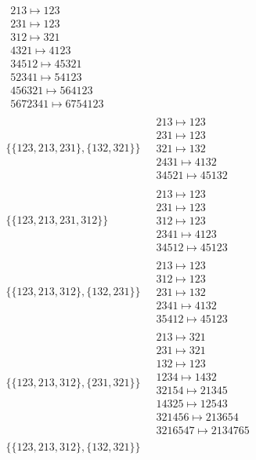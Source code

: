 \begin{scriptsize}
\begin{align}
\begin{matrix}
213 \mapsto 123
\\
231 \mapsto 123
\\
312 \mapsto 321
\\
4321 \mapsto 4123
\\
34512 \mapsto 45321
\\
52341 \mapsto 54123
\\
456321 \mapsto 564123
\\
5672341 \mapsto 6754123
\end{matrix}
\\
\{\{123, 213, 231\}, \{132, 321\}\}
\ 
&
\begin{matrix}
213 \mapsto 123
\\
231 \mapsto 123
\\
321 \mapsto 132
\\
2431 \mapsto 4132
\\
34521 \mapsto 45132
\end{matrix}
\\
\{\{123, 213, 231, 312\}\}
\ 
&
\begin{matrix}
213 \mapsto 123
\\
231 \mapsto 123
\\
312 \mapsto 123
\\
2341 \mapsto 4123
\\
34512 \mapsto 45123
\end{matrix}
\\
\{\{123, 213, 312\}, \{132, 231\}\}
\ 
&
\begin{matrix}
213 \mapsto 123
\\
312 \mapsto 123
\\
231 \mapsto 132
\\
2341 \mapsto 4132
\\
35412 \mapsto 45123
\end{matrix}
\\
\{\{123, 213, 312\}, \{231, 321\}\}
\ 
&
\begin{matrix}
213 \mapsto 321
\\
231 \mapsto 321
\\
132 \mapsto 123
\\
1234 \mapsto 1432
\\
32154 \mapsto 21345
\\
14325 \mapsto 12543
\\
321456 \mapsto 213654
\\
3216547 \mapsto 2134765
\end{matrix}
\\
\{\{123, 213, 312\}, \{132, 321\}\}
\ 
&
\begin{matrix}

\end{matrix}
\end{align}
\end{scriptsize}
